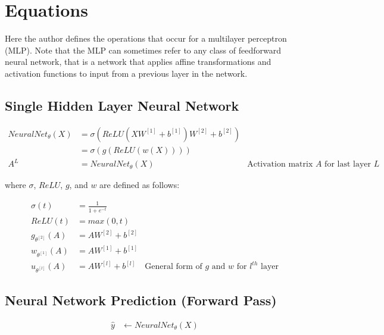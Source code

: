 \documentclass{article}
\begin{document}
\section{Equations}
\quad Here the author defines the operations that occur for a multilayer perceptron (MLP). Note
that the MLP can sometimes refer to any class of feedforward
neural network, that is a network that applies affine transformations and
activation functions to input from a previous layer in the network.

\subsection{Single Hidden Layer Neural Network}
\begin{equation}
	\begin{aligned}
		NeuralNet_{\theta}(X) & =
		\sigma(ReLU(XW^{[1]}
		+ {b}^{[1]})W^{[2]} + {b}^{[2]})                                                                  \\
		                      & = \sigma(g(ReLU(w(X))))                                                   \\
		A^{L}                 & = NeuralNet_{\theta}(X) & \text{Activation matrix $A$ for last layer $L$}
	\end{aligned}
\end{equation}

where $\sigma$, $ReLU$, $g$, and $w$ are defined as follows:

\begin{equation}
	\begin{aligned}
		\sigma(t)           & = \frac{1}{1 + e^{-t}}                                                         \\
		ReLU(t)             & = max(0, t)                                                                    \\
		g_{\theta^{[2]}}(A) & = AW^{[2]} + {b}^{[2]}                                                         \\
		w_{\theta^{[1]}}(A) & = AW^{[1]} + {b}^{[1]}                                                         \\
		u_{\theta^{[l]}}(A) & = AW^{[l]} + b^{[l]}   & \text{General form of $g$ and $w$ for $l^{th}$ layer}
	\end{aligned}
\end{equation}

\subsection{Neural Network Prediction (Forward Pass)}
\begin{align}
	\hat{y} & \gets NeuralNet_\theta(X)
\end{align}
\end{document}
